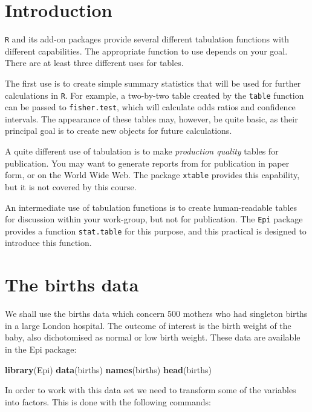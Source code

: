 \documentclass[
]{book}
\newenvironment{Shaded}{\begin{snugshade}}{\end{snugshade}}
\newcommand{\FunctionTok}[1]{\textcolor[rgb]{0.13,0.29,0.53}{\textbf{#1}}}
\newcommand{\NormalTok}[1]{#1}
\begin{document}
\section{Introduction}\label{introduction-2}

\texttt{R} and its add-on packages provide several different
tabulation functions with different capabilities. The appropriate function
to use depends on your goal. There are at least three different uses for
tables.

The first use is to create simple summary statistics that will be used
for further calculations in \texttt{R}. For example,
a two-by-two table created by the \texttt{table} function can be passed
to \texttt{fisher.test}, which will calculate odds ratios and confidence
intervals. The appearance of these tables may, however, be quite basic,
as their principal goal is to create new objects for future calculations.

A quite different use of tabulation is to make \emph{production quality}
tables for publication. You may want to generate reports from for
publication in paper form, or on the World Wide Web. The package
\texttt{xtable} provides this capability, but it is not covered by this course.

An intermediate use of tabulation functions is to create human-readable
tables for discussion within your work-group, but not for publication. The
\texttt{Epi} package provides a function \texttt{stat.table} for this purpose,
and this practical is designed to introduce this function.

\section{The births data}\label{the-births-data-1}

We shall use the births data which concern 500 mothers who had
singleton births in a large London hospital. The outcome of interest
is the birth weight of the baby, also dichotomised as normal or low
birth weight. These data are available in the Epi package:

\begin{Shaded}
\begin{Highlighting}[]
\FunctionTok{library}\NormalTok{(Epi)}
\FunctionTok{data}\NormalTok{(births)}
\FunctionTok{names}\NormalTok{(births)}
\FunctionTok{head}\NormalTok{(births)}
\end{Highlighting}
\end{Shaded}

In order to work with this data set we need to transform some of the variables
into factors. This is done with the following commands:
\end{document}
